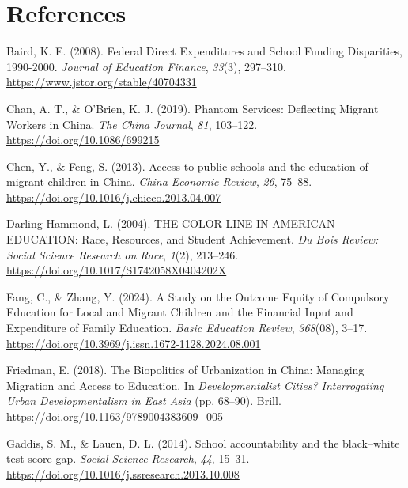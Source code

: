 \documentclass[
  man,
  floatsintext,
  longtable,
  nolmodern,
  notxfonts,
  notimes,
  colorlinks=true,linkcolor=blue,citecolor=blue,urlcolor=blue]{apa7}
\newlength{\cslhangindent}
\newenvironment{CSLReferences}[2] %
 {\begin{list}{}{%
  \setlength{\itemindent}{0pt}
  \setlength{\leftmargin}{0pt}
  \setlength{\parsep}{0pt}
  \ifodd #1
   \setlength{\leftmargin}{\cslhangindent}
   \setlength{\itemindent}{-1\cslhangindent}
  \fi
  \setlength{\itemsep}{#2\baselineskip}}}
 {\end{list}}
\begin{document}
\clearpage

\section{References}\label{references}

\label{refs}
\begin{CSLReferences}{1}{0}
Baird, K. E. (2008). Federal {Direct Expenditures} and {School Funding
Disparities}, 1990-2000. \emph{Journal of Education Finance},
\emph{33}(3), 297--310. \url{https://www.jstor.org/stable/40704331}

Chan, A. T., \& O'Brien, K. J. (2019). Phantom {Services}: {Deflecting
Migrant Workers} in {China}. \emph{The China Journal}, \emph{81},
103--122. \url{https://doi.org/10.1086/699215}

Chen, Y., \& Feng, S. (2013). Access to public schools and the education
of migrant children in {China}. \emph{China Economic Review}, \emph{26},
75--88. \url{https://doi.org/10.1016/j.chieco.2013.04.007}

Darling-Hammond, L. (2004). {THE COLOR LINE IN AMERICAN EDUCATION}:
{Race}, {Resources}, and {Student Achievement}. \emph{Du Bois Review:
Social Science Research on Race}, \emph{1}(2), 213--246.
\url{https://doi.org/10.1017/S1742058X0404202X}

Fang, C., \& Zhang, Y. (2024). {A Study on the Outcome Equity of
Compulsory Education for Local and Migrant Children and the Financial
Input and Expenditure of Family Education}. \emph{Basic Education
Review}, \emph{368}(08), 3--17.
\url{https://doi.org/10.3969/j.issn.1672-1128.2024.08.001}

Friedman, E. (2018). The {Biopolitics} of {Urbanization} in {China}:
{Managing Migration} and {Access} to {Education}. In
\emph{Developmentalist {Cities}? {Interrogating Urban Developmentalism}
in {East Asia}} (pp. 68--90). Brill.
\url{https://doi.org/10.1163/9789004383609_005}

Gaddis, S. M., \& Lauen, D. L. (2014). School accountability and the
black--white test score gap. \emph{Social Science Research}, \emph{44},
15--31. \url{https://doi.org/10.1016/j.ssresearch.2013.10.008}


\end{CSLReferences}
\end{document}
